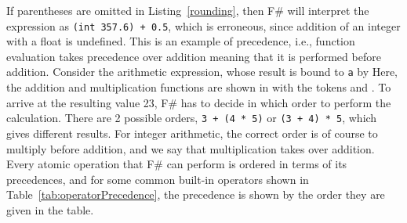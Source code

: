 If parentheses are omitted in Listing~\ref{rounding}, then F\# will interpret the expression as \lstinline|(int 357.6) + 0.5|, which is erroneous, since addition of an integer with a float is undefined. This is an example of precedence, i.e., function evaluation takes precedence over addition meaning that it is performed before addition. Consider the arithmetic expression, whose result is bound to \lstinline|a| by
%
Here, the addition and multiplication functions are shown in  with the  tokens \token{+} and \token{*}. To arrive at the resulting value 23, F\# has to decide in which order to perform the calculation. There are 2 possible orders, \lstinline|3 + (4 * 5)| or \lstinline|(3 + 4) * 5|, which gives different results. For integer arithmetic, the correct order is of course to multiply before addition, and we say that multiplication takes  over addition. Every atomic operation that F\# can perform is ordered in terms of its precedences, and for some common built-in operators shown in Table~\ref{tab:operatorPrecedence}, the precedence is shown by the order they are given in the table.
